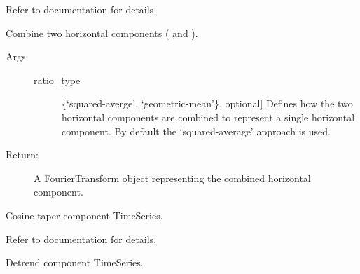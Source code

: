 \documentclass[letterpaper,10pt,english,openany,oneside]{sphinxmanual}
\begin{document}
\begin{fulllineitems}
\begin{fulllineitems}
Refer to  documentation for details.

\end{fulllineitems}


\begin{fulllineitems}
\label{\detokenize{index:hvsrpy.Sensor3c.combine_horizontals}}
Combine two horizontal components ( and ).
\begin{description}
\item[{Args:}] \leavevmode\begin{description}
\item[{ratio\_type}] \leavevmode{[}\{‘squared-averge’, ‘geometric-mean’\}, optional{]}
Defines how the two horizontal components are combined 
to represent a single horizontal component. By default
the ‘squared-average’ approach is used.

\end{description}

\item[{Return:}] \leavevmode
A FourierTransform object representing the combined
horizontal component.

\end{description}

\end{fulllineitems}


\begin{fulllineitems}
\label{\detokenize{index:hvsrpy.Sensor3c.cosine_taper}}
Cosine taper component TimeSeries.

Refer to  documentation for details.

\end{fulllineitems}


\begin{fulllineitems}
\label{\detokenize{index:hvsrpy.Sensor3c.detrend}}
Detrend component TimeSeries.


\end{fulllineitems}
\end{fulllineitems}
\end{document}
